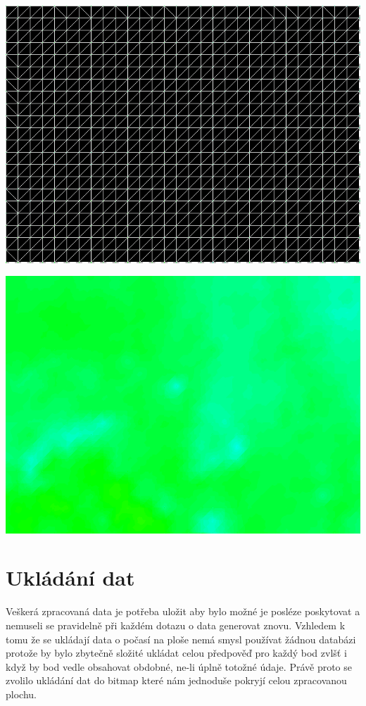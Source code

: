\documentclass[czech,bachelor,dept460,male,csharp,cpdeclaration]{diploma}
\begin{document}
	\begin{center}
		\includegraphics[scale=0.5]{Data/bmp_sit.png}
	\end{center}

	\begin{center}
		\includegraphics[scale=0.5]{Data/bmp_vybarvena.png}
	\end{center}
	
	\section{Ukládání dat}
	
	Veškerá zpracovaná data je potřeba uložit aby bylo možné je posléze poskytovat a nemuseli se pravidelně při každém dotazu o data generovat znovu. Vzhledem k tomu že se ukládají data o počasí na ploše nemá smysl používat žádnou databázi protože by bylo zbytečně složité ukládat celou předpověď pro každý bod zvlšť i když by bod vedle obsahovat obdobné, ne-li úplně totožné údaje. Právě proto se zvolilo ukládání dat do bitmap které nám jednoduše pokryjí celou zpracovanou plochu.
	
\end{document}
